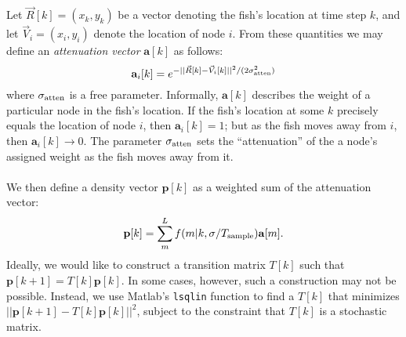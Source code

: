 \documentclass[11pt,letterpaper]{article}
\begin{document}
	Let $\vec{R}[k] = (x_k, y_k)$ be a vector denoting the fish's location at time step $k$, and let $\vec{V}_i = (x_i, y_i)$ denote the location of node $i$. From these quantities we may define an \textit{attenuation vector} $\mathbf{a}[k]$ as follows:
	\[
		\mathbf a_i[k] = e^{-||\vec{R}[k] - \vec{V}_i[k]||^2 / (2 \sigma_{\rm atten}^2)}
	\]
	where $\sigma_{\rm atten}$ is a free parameter. Informally, $\mathbf a[k]$ describes the weight of a particular node in the fish's location. If the fish's location at some $k$ precisely equals the location of node $i$, then $\mathbf a_i[k] = 1$; but as the fish moves away from $i$, then $\mathbf a_i[k] \rightarrow 0$. The parameter $\sigma_{\rm atten}$ sets the ``attenuation'' of the a node's assigned weight as the fish moves away from it.
	\\\\
	We then define a density vector $\mathbf {p}[k]$ as a weighted sum of the attenuation vector:
	\[
		\mathbf p[k] = \sum^L_m f(m|k, \sigma / T_{\rm sample}) \mathbf a[m].
	\]
	Ideally, we would like to construct a transition matrix $T[k]$ such that $\mathbf{p}[k + 1] = T[k]\mathbf{p}[k]$. In some cases, however, such a construction may not be possible. Instead, we use Matlab's \verb|lsqlin| function to find a $T[k]$ that minimizes $||\mathbf p[k + 1] - T[k]\mathbf p[k] ||^2$, subject to the constraint that $T[k]$ is a stochastic matrix. 
	
	
	
\end{document}
